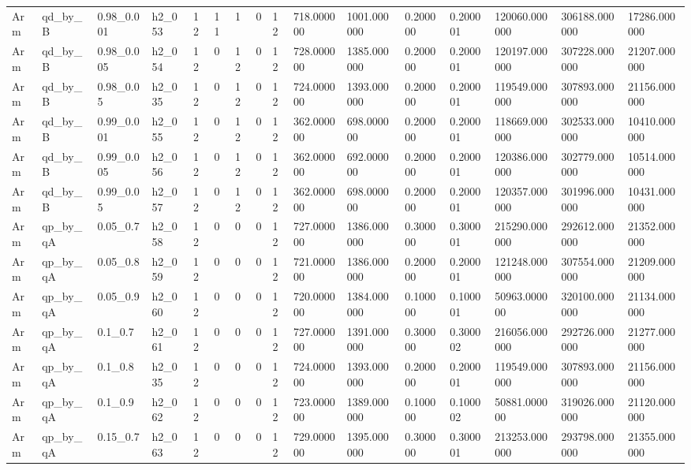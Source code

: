 \begin{tabular}{llllllllllllllll}
Arm & qd\_by\_B & 0.98\_0.001 & h2\_053 & 12 & 11 & 1 & 0 & 12 & 718.000000 & 1001.000000 & 0.200000 & 0.200001 & 120060.000000 & 306188.000000 & 17286.000000 \\
Arm & qd\_by\_B & 0.98\_0.005 & h2\_054 & 12 & 0 & 12 & 0 & 12 & 728.000000 & 1385.000000 & 0.200000 & 0.200001 & 120197.000000 & 307228.000000 & 21207.000000 \\
Arm & qd\_by\_B & 0.98\_0.05 & h2\_035 & 12 & 0 & 12 & 0 & 12 & 724.000000 & 1393.000000 & 0.200000 & 0.200001 & 119549.000000 & 307893.000000 & 21156.000000 \\
Arm & qd\_by\_B & 0.99\_0.001 & h2\_055 & 12 & 0 & 12 & 0 & 12 & 362.000000 & 698.000000 & 0.200000 & 0.200001 & 118669.000000 & 302533.000000 & 10410.000000 \\
Arm & qd\_by\_B & 0.99\_0.005 & h2\_056 & 12 & 0 & 12 & 0 & 12 & 362.000000 & 692.000000 & 0.200000 & 0.200001 & 120386.000000 & 302779.000000 & 10514.000000 \\
Arm & qd\_by\_B & 0.99\_0.05 & h2\_057 & 12 & 0 & 12 & 0 & 12 & 362.000000 & 698.000000 & 0.200000 & 0.200001 & 120357.000000 & 301996.000000 & 10431.000000 \\
Arm & qp\_by\_qA & 0.05\_0.7 & h2\_058 & 12 & 0 & 0 & 0 & 12 & 727.000000 & 1386.000000 & 0.300000 & 0.300001 & 215290.000000 & 292612.000000 & 21352.000000 \\
Arm & qp\_by\_qA & 0.05\_0.8 & h2\_059 & 12 & 0 & 0 & 0 & 12 & 721.000000 & 1386.000000 & 0.200000 & 0.200001 & 121248.000000 & 307554.000000 & 21209.000000 \\
Arm & qp\_by\_qA & 0.05\_0.9 & h2\_060 & 12 & 0 & 0 & 0 & 12 & 720.000000 & 1384.000000 & 0.100000 & 0.100001 & 50963.000000 & 320100.000000 & 21134.000000 \\
Arm & qp\_by\_qA & 0.1\_0.7 & h2\_061 & 12 & 0 & 0 & 0 & 12 & 727.000000 & 1391.000000 & 0.300000 & 0.300002 & 216056.000000 & 292726.000000 & 21277.000000 \\
Arm & qp\_by\_qA & 0.1\_0.8 & h2\_035 & 12 & 0 & 0 & 0 & 12 & 724.000000 & 1393.000000 & 0.200000 & 0.200001 & 119549.000000 & 307893.000000 & 21156.000000 \\
Arm & qp\_by\_qA & 0.1\_0.9 & h2\_062 & 12 & 0 & 0 & 0 & 12 & 723.000000 & 1389.000000 & 0.100000 & 0.100002 & 50881.000000 & 319026.000000 & 21120.000000 \\
Arm & qp\_by\_qA & 0.15\_0.7 & h2\_063 & 12 & 0 & 0 & 0 & 12 & 729.000000 & 1395.000000 & 0.300000 & 0.300001 & 213253.000000 & 293798.000000 & 21355.000000 \\

\end{tabular}
